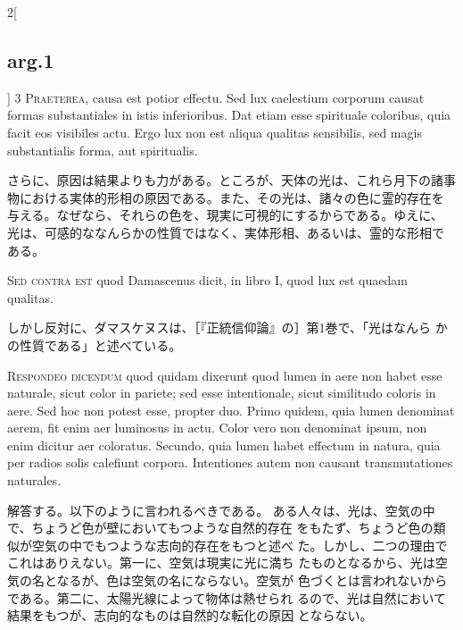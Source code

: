\documentclass[paper=a4paper,fontsize=10pt,jafontsize=9pt,titlepage]{jlreq}
\begin{document}
\begin{paracol}{2}[\subsection{arg.1}]
{\scshape 3 Praeterea}, causa est potior effectu. Sed
lux caelestium corporum causat formas substantiales in istis
inferioribus. Dat etiam esse spirituale coloribus, quia facit eos
visibiles actu. Ergo lux non est aliqua qualitas sensibilis, sed magis
substantialis forma, aut spiritualis.

\switchcolumn

さらに、原因は結果よりも力がある。ところが、天体の光は、これら月下の諸事
 物における実体的形相の原因である。また、その光は、諸々の色に霊的存在を
 与える。なぜなら、それらの色を、現実に可視的にするからである。ゆえに、
 光は、可感的ななんらかの性質ではなく、実体形相、あるいは、霊的な形相で
 ある。

\switchcolumn*[\subsection{s.c.}]

{\scshape  Sed contra est} quod Damascenus dicit, in
libro I, quod lux est quaedam qualitas.

\switchcolumn

しかし反対に、ダマスケヌスは、［『正統信仰論』の］第1巻で、「光はなんら
 かの性質である」と述べている。


{\scshape Respondeo dicendum} quod quidam dixerunt quod
lumen in aere non habet esse naturale, sicut color in pariete; sed esse
intentionale, sicut similitudo coloris in aere. Sed hoc non potest esse,
propter duo. Primo quidem, quia lumen denominat aerem, fit enim aer
luminosus in actu. Color vero non denominat ipsum, non enim dicitur aer
coloratus. Secundo, quia lumen habet effectum in natura, quia per radios
solis calefiunt corpora. Intentiones autem non causant transmutationes
naturales.

\switchcolumn

解答する。以下のように言われるべきである。
ある人々は、光は、空気の中で、ちょうど色が壁においてもつような自然的存在
 をもたず、ちょうど色の類似が空気の中でもつような志向的存在をもつと述べ
 た。しかし、二つの理由でこれはありえない。第一に、空気は現実に光に満ち
 たものとなるから、光は空気の名となるが、色は空気の名にならない。空気が
 色づくとは言われないからである。第二に、太陽光線によって物体は熱せられ
 るので、光は自然において結果をもつが、志向的なものは自然的な転化の原因
 とならない。


\end{paracol}
\end{document}
